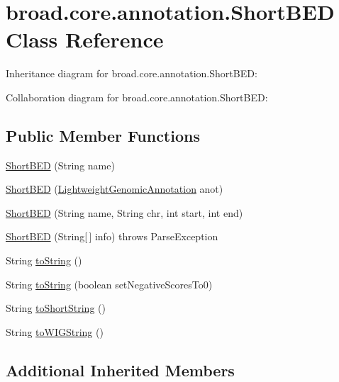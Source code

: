 \hypertarget{classbroad_1_1core_1_1annotation_1_1_short_b_e_d}{\section{broad.\+core.\+annotation.\+Short\+B\+E\+D Class Reference}
\label{classbroad_1_1core_1_1annotation_1_1_short_b_e_d}
}


Inheritance diagram for broad.\+core.\+annotation.\+Short\+B\+E\+D\+:


Collaboration diagram for broad.\+core.\+annotation.\+Short\+B\+E\+D\+:
\subsection*{Public Member Functions}
\begin{DoxyCompactItemize}
\item 
\hyperlink{classbroad_1_1core_1_1annotation_1_1_short_b_e_d_aae8d1aec9bf579658cdf69d570c20e10}{Short\+B\+E\+D} (String name)
\item 
\hyperlink{classbroad_1_1core_1_1annotation_1_1_short_b_e_d_a0ffe81a162a9e07bcf04bae179f41944}{Short\+B\+E\+D} (\hyperlink{interfacebroad_1_1core_1_1annotation_1_1_lightweight_genomic_annotation}{Lightweight\+Genomic\+Annotation} anot)
\item 
\hyperlink{classbroad_1_1core_1_1annotation_1_1_short_b_e_d_aa4e5364e3f4f070ebbcade6bef4bede8}{Short\+B\+E\+D} (String name, String chr, int start, int end)
\item 
\hyperlink{classbroad_1_1core_1_1annotation_1_1_short_b_e_d_a25624022cab2a28e5f4d7585e606dad4}{Short\+B\+E\+D} (String\mbox{[}$\,$\mbox{]} info)  throws Parse\+Exception 
\item 
String \hyperlink{classbroad_1_1core_1_1annotation_1_1_short_b_e_d_a1987b86e89eb7f3fec66ff923ed7dbc7}{to\+String} ()
\item 
String \hyperlink{classbroad_1_1core_1_1annotation_1_1_short_b_e_d_a5694f543837cd15e5c47802a8e6ab6f6}{to\+String} (boolean set\+Negative\+Scores\+To0)
\item 
String \hyperlink{classbroad_1_1core_1_1annotation_1_1_short_b_e_d_ae9fa60346143f1cd0134c75799a667cf}{to\+Short\+String} ()
\item 
String \hyperlink{classbroad_1_1core_1_1annotation_1_1_short_b_e_d_a9d877f34cbd81aa20a5fe08e13597a7b}{to\+W\+I\+G\+String} ()
\end{DoxyCompactItemize}
\subsection*{Additional Inherited Members}


